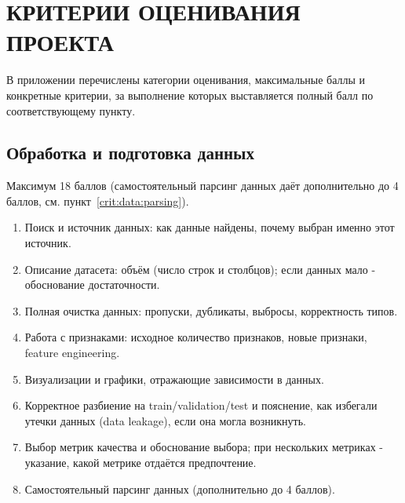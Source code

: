\chapter{КРИТЕРИИ ОЦЕНИВАНИЯ ПРОЕКТА}
\label{app:categories}

В приложении перечислены категории оценивания, максимальные баллы и
конкретные критерии, за выполнение которых выставляется полный балл по
соответствующему пункту.

\section{Обработка и подготовка данных}
\label{sec:crit:data}

Максимум 18 баллов (самостоятельный парсинг данных даёт дополнительно до
4 баллов, см. пункт~\ref{crit:data:parsing}).

\begin{enumerate}
  \item Поиск и источник данных: как данные найдены, почему выбран именно
  этот источник.
  \label{crit:data:source}

  \item Описание датасета: объём (число строк и столбцов); если данных
  мало - обоснование достаточности.
  \label{crit:data:dataset}

  \item Полная очистка данных: пропуски, дубликаты, выбросы, корректность
  типов.
  \label{crit:data:cleaning}

  \item Работа с признаками: исходное количество признаков, новые признаки,
  feature engineering.
  \label{crit:data:features}

  \item Визуализации и графики, отражающие зависимости в данных.
  \label{crit:data:viz}

  \item Корректное разбиение на train/validation/test и пояснение, как
  избегали утечки данных (data leakage), если она могла возникнуть.
  \label{crit:data:split}

  \item Выбор метрик качества и обоснование выбора; при нескольких метриках
  - указание, какой метрике отдаётся предпочтение.
  \label{crit:data:metrics}

  \item Самостоятельный парсинг данных (дополнительно до 4 баллов).
  \label{crit:data:parsing}
\end{enumerate}

